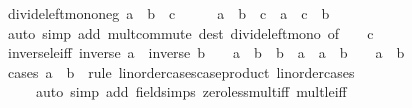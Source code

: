 \begin{isabellebody}
\endisatagproof
{\isafoldproof}%
%
\isadelimproof
\isanewline
%
\endisadelimproof
\isanewline
{}\isamarkupfalse%
\ divide{\isacharunderscore}{\kern0pt}left{\isacharunderscore}{\kern0pt}mono{\isacharunderscore}{\kern0pt}neg{\isacharcolon}{\kern0pt}\ {\isachardoublequoteopen}a\ {\isasymle}\ b\ {\isasymLongrightarrow}\ c\ {\isasymle}\ {}\ {\isasymLongrightarrow}\ {}\ {\isacharless}{\kern0pt}\ a\ {\isacharasterisk}{\kern0pt}\ b\ {\isasymLongrightarrow}\ c\ {\isacharslash}{\kern0pt}\ a\ {\isasymle}\ c\ {\isacharslash}{\kern0pt}\ b{\isachardoublequoteclose}\isanewline
%
\isadelimproof
\ \ %
\endisadelimproof
%
\isatagproof
{}\isamarkupfalse%
\ {\isacharparenleft}{\kern0pt}auto\ simp\ add{\isacharcolon}{\kern0pt}\ mult{\isachardot}{\kern0pt}commute\ dest{\isacharcolon}{\kern0pt}\ divide{\isacharunderscore}{\kern0pt}left{\isacharunderscore}{\kern0pt}mono\ {\isacharbrackleft}{\kern0pt}of\ {\isacharunderscore}{\kern0pt}\ {\isacharunderscore}{\kern0pt}\ {\isachardoublequoteopen}{\isacharminus}{\kern0pt}\ c{\isachardoublequoteclose}{\isacharbrackright}{\kern0pt}{\isacharparenright}{\kern0pt}%
\endisatagproof
{\isafoldproof}%
%
\isadelimproof
\isanewline
%
\endisadelimproof
\isanewline
{}\isamarkupfalse%
\ inverse{\isacharunderscore}{\kern0pt}le{\isacharunderscore}{\kern0pt}iff{\isacharcolon}{\kern0pt}\ {\isachardoublequoteopen}inverse\ a\ {\isasymle}\ inverse\ b\ {\isasymlongleftrightarrow}\ {\isacharparenleft}{\kern0pt}{}\ {\isacharless}{\kern0pt}\ a\ {\isacharasterisk}{\kern0pt}\ b\ {\isasymlongrightarrow}\ b\ {\isasymle}\ a{\isacharparenright}{\kern0pt}\ {\isasymand}\ {\isacharparenleft}{\kern0pt}a\ {\isacharasterisk}{\kern0pt}\ b\ {\isasymle}\ {}\ {\isasymlongrightarrow}\ a\ {\isasymle}\ b{\isacharparenright}{\kern0pt}{\isachardoublequoteclose}\isanewline
%
\isadelimproof
\ \ %
\endisadelimproof
%
\isatagproof
{}\isamarkupfalse%
\ {\isacharparenleft}{\kern0pt}cases\ a\ {}\ b\ {}\ rule{\isacharcolon}{\kern0pt}\ linorder{\isacharunderscore}{\kern0pt}cases{\isacharbrackleft}{\kern0pt}case{\isacharunderscore}{\kern0pt}product\ linorder{\isacharunderscore}{\kern0pt}cases{\isacharbrackright}{\kern0pt}{\isacharparenright}{\kern0pt}\isanewline
\ \ \ \ \ {\isacharparenleft}{\kern0pt}auto\ simp\ add{\isacharcolon}{\kern0pt}\ field{\isacharunderscore}{\kern0pt}simps\ zero{\isacharunderscore}{\kern0pt}less{\isacharunderscore}{\kern0pt}mult{\isacharunderscore}{\kern0pt}iff\ mult{\isacharunderscore}{\kern0pt}le{\isacharunderscore}{\kern0pt}{}{\isacharunderscore}{\kern0pt}iff{\isacharparenright}{\kern0pt}%

\end{isabellebody}
